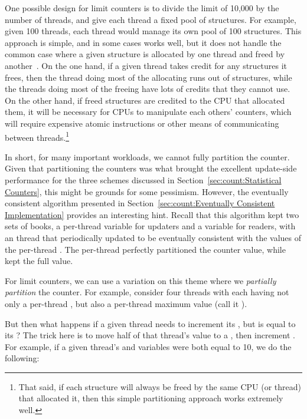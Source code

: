 One possible design for limit counters is to divide the limit of 10,000
by the number of threads, and give each thread a fixed pool of structures.
For example, given 100 threads, each thread would manage its own pool
of 100 structures.
This approach is simple, and in some cases works well, but it does not
handle the common case where a given structure is allocated by one
thread and freed by another~\cite{McKenney93}.
On the one hand, if a given thread takes credit for any structures it
frees, then the thread doing most of the allocating runs out
of structures, while the threads doing most of the freeing have lots
of credits that they cannot use.
On the other hand, if freed structures are credited to the CPU that
allocated them, it will be necessary for CPUs to manipulate each
others' counters, which will require expensive atomic instructions
or other means of communicating between threads.\footnote{
	That said, if each structure will always be freed
	by the same CPU (or thread) that allocated it, then
	this simple partitioning approach works extremely well.}

In short, for many important workloads, we cannot fully partition the counter.
Given that partitioning the counters was what brought the excellent
update-side performance for the three schemes discussed in
Section~\ref{sec:count:Statistical Counters}, this might be grounds
for some pessimism.
However, the eventually consistent algorithm presented in
Section~\ref{sec:count:Eventually Consistent Implementation}
provides an interesting hint.
Recall that this algorithm kept two sets of books, a
per-thread  variable for updaters and a 
variable for readers, with an  thread that periodically
updated  to be eventually consistent with the values
of the per-thread .
The per-thread  perfectly partitioned the counter value, while
 kept the full value.

For limit counters, we can use a variation on this theme where we
\emph{partially partition} the counter.
For example, consider four threads with each having not only a
per-thread , but also a per-thread maximum value (call
it ).

But then what happens if a given thread needs to increment its
, but  is equal to its ?
The trick here is to move half of that thread's  value
to a , then increment .
For example, if a given thread's  and 
variables were both equal to 10, we do the following:

